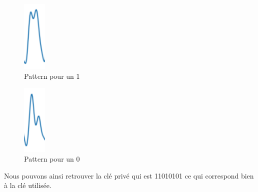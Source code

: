 \begin{minipage}[c]{0.45\textwidth}
\begin{figure}[H]
    \centering
    \includegraphics[width=0.1\textwidth]{fig/un.png}
    \caption{Pattern pour un 1}
    \label{fig:pat_un}
\end{figure}
\end{minipage}
\begin{minipage}[c]{0.45\textwidth}
\begin{figure}[H]
    \centering
    \includegraphics[width=0.1\textwidth]{fig/zero.png}
    \caption{Pattern pour un 0}
    \label{fig:pat_zero}
\end{figure}
\end{minipage}

\vspace{0.4 cm}
Nous pouvons ainsi retrouver la clé privé qui est 11010101 ce qui correspond bien à la clé utilisée.


